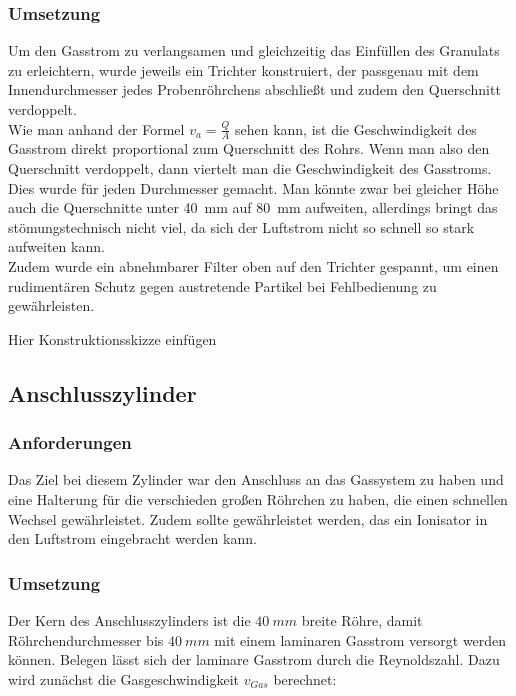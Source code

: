 \subsubsection{Umsetzung}

Um den Gasstrom zu verlangsamen und gleichzeitig das Einfüllen des Granulats zu erleichtern, wurde jeweils ein Trichter konstruiert, der passgenau mit dem Innendurchmesser jedes Probenröhrchens abschließt und zudem den Querschnitt verdoppelt. \\
Wie man anhand der Formel $v_a = \frac{Q}{A}$ \cite{Grollius2012} sehen kann, ist die Geschwindigkeit des Gasstrom direkt proportional zum Querschnitt des Rohrs. Wenn man also den Querschnitt verdoppelt, dann viertelt man die Geschwindigkeit des Gasstroms. Dies wurde für jeden Durchmesser gemacht. Man könnte zwar bei gleicher Höhe auch die Querschnitte unter \SI{40}{mm} auf \SI{80}{mm} aufweiten, allerdings bringt das stömungstechnisch nicht viel, da sich der Luftstrom nicht so schnell so stark aufweiten kann. \\
Zudem wurde ein abnehmbarer Filter oben auf den Trichter gespannt, um einen rudimentären Schutz gegen austretende Partikel bei Fehlbedienung zu gewährleisten.

Hier Konstruktionsskizze einfügen


\subsection{Anschlusszylinder}

\subsubsection{Anforderungen}

Das Ziel bei diesem Zylinder war den Anschluss an das Gassystem zu haben und eine Halterung für die verschieden großen Röhrchen zu haben, die einen schnellen Wechsel gewährleistet. Zudem sollte gewährleistet werden, das ein Ionisator in den Luftstrom eingebracht werden kann.


\subsubsection{Umsetzung}

Der Kern des Anschlusszylinders ist die $\SI{40}{mm}$ breite Röhre, damit Röhrchendurchmesser bis $\SI{40}{mm}$ mit einem laminaren Gasstrom versorgt werden können. Belegen lässt sich der laminare Gasstrom durch die Reynoldszahl. Dazu wird zunächst die Gasgeschwindigkeit $v_{Gas}$ berechnet:

